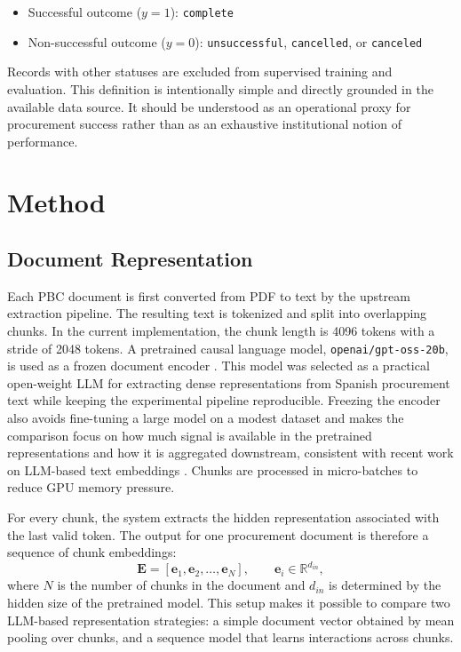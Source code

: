 \documentclass[conference]{IEEEtran}
\begin{document}
\begin{itemize}
  \item Successful outcome ($y=1$): \texttt{complete}
  \item Non-successful outcome ($y=0$): \texttt{unsuccessful}, \texttt{cancelled}, or \texttt{canceled}
\end{itemize}

Records with other statuses are excluded from supervised training and evaluation. This definition is intentionally simple and directly grounded in the available data source. It should be understood as an operational proxy for procurement success rather than as an exhaustive institutional notion of performance.

\section{Method}
\subsection{Document Representation}
Each PBC document is first converted from PDF to text by the upstream extraction pipeline. The resulting text is tokenized and split into overlapping chunks. In the current implementation, the chunk length is 4096 tokens with a stride of 2048 tokens. A pretrained causal language model, \texttt{openai/gpt-oss-20b}, is used as a frozen document encoder \cite{agarwal2025gptoss}. This model was selected as a practical open-weight LLM for extracting dense representations from Spanish procurement text while keeping the experimental pipeline reproducible. Freezing the encoder also avoids fine-tuning a large model on a modest dataset and makes the comparison focus on how much signal is available in the pretrained representations and how it is aggregated downstream, consistent with recent work on LLM-based text embeddings \cite{wang2024improvingembeddings}. Chunks are processed in micro-batches to reduce GPU memory pressure.

For every chunk, the system extracts the hidden representation associated with the last valid token. The output for one procurement document is therefore a sequence of chunk embeddings:
\[
\mathbf{E} = [\mathbf{e}_1, \mathbf{e}_2, \dots, \mathbf{e}_N], \qquad \mathbf{e}_i \in \mathbb{R}^{d_{in}},
\]
where $N$ is the number of chunks in the document and $d_{in}$ is determined by the hidden size of the pretrained model. This setup makes it possible to compare two LLM-based representation strategies: a simple document vector obtained by mean pooling over chunks, and a sequence model that learns interactions across chunks.
\end{document}
